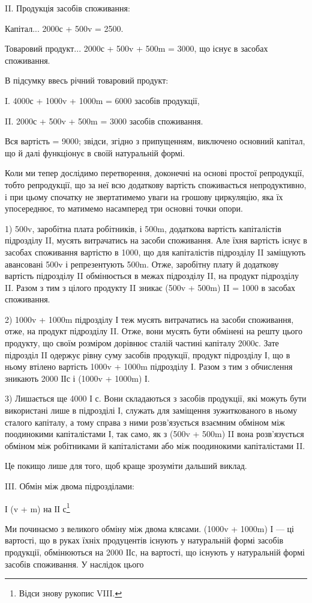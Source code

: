 II. Продукція засобів споживання:

Капітал... 2000с + 500v = 2500.

Товаровий продукт... 2000с + 500v + 500m = 3000, що існує в
засобах споживання.

В підсумку ввесь річний товаровий продукт:

I.    4000с + 1000v + 1000m = 6000 засобів продукції,

II.    2000с + 500v + 500m = 3000 засобів споживання.

Вся вартість = 9000; звідси, згідно з припущенням, виключено основний
капітал, що й далі функціонує в своїй натуральній формі.

Коли ми тепер дослідимо перетворення, доконечні на основі простої
репродукції, тобто репродукції, що за неї всю додаткову вартість
споживається непродуктивно, і при цьому спочатку не звертатимемо уваги
на грошову циркуляцію, яка їх упосереднює, то матимемо насамперед
три основні точки опори.

1) 500v, заробітна плата робітників, і 500m, додаткова вартість капіталістів
підрозділу II, мусять витрачатись на засоби споживання. Але
їхня вартість існує в засобах споживання вартістю в 1000, що для капіталістів
підрозділу II заміщують авансовані 500v і репрезентують 500m.
Отже, заробітну плату й додаткову вартість підрозділу II обмінюється
в межах підрозділу II, на продукт підрозділу II. Разом з тим з цілого
продукту II зникає (500v + 500m) II = 1000 в засобах споживання.

2) 1000v + 1000m підрозділу І теж мусять витрачатись на засоби
споживання, отже, на продукт підрозділу II. Отже, вони мусять бути обмінені
на решту цього продукту, що своїм розміром дорівнює сталій
частині капіталу 2000с. Зате підрозділ II одержує рівну суму засобів
продукції, продукт підрозділу І, що в ньому втілено вартість 1000v +
1000m підрозділу І. Разом з тим з обчислення зникають 2000 ІІс і
(1000v + 1000m) І.

3) Лишається ще 4000 І с. Вони складаються з засобів продукції, які
можуть бути використані лише в підрозділі І, служать для заміщення
зужиткованого в ньому сталого капіталу, а тому справа з ними розв’язується
взаємним обміном між поодинокими капіталістами І, так само, як
з (500v + 500m) II вона розв’язується обміном між робітниками й капіталістами
або між поодинокими капіталістами II.

Це покищо лише для того, щоб краще зрозуміти дальший виклад.

III. Обмін між двома підрозділами:

І (v + m) на ІІ с\footnote{
Відси знову рукопис VIII.
}

Ми починаємо з великого обміну між двома клясами. (1000v +
1000m) І — ці вартості, що в руках їхніх продуцентів існують у натуральній
формі засобів продукції, обмінюються на 2000 ІІс, на вартості,
що існують у натуральній формі засобів споживання. У наслідок цього